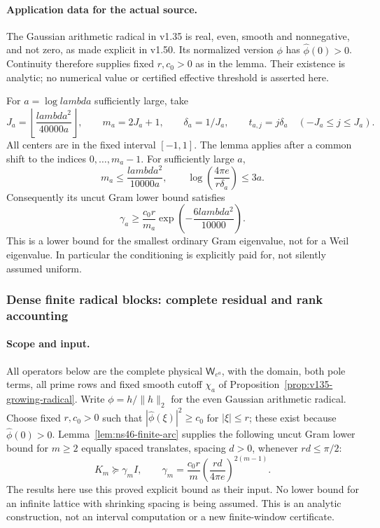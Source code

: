 \documentclass[11pt]{article}
\def\lambda{lambda}%
\theoremstyle{remark}
\begin{document}
\paragraph{Application data for the actual source.}
The Gaussian arithmetic radical in v1.35 is real, even, smooth and
nonnegative, and not zero, as made explicit in v1.50. Its normalized
version $\phi$ has $\widehat\phi(0)>0$. Continuity therefore supplies
fixed $r,c_0>0$ as in the lemma. Their existence is analytic; no numerical
value or certified effective threshold is asserted here.

For $a=\log\lambda$ sufficiently large, take
\[
 J_a=\left\lfloor\frac{\lambda^2}{40000a}\right\rfloor,
 \qquad m_a=2J_a+1,\qquad \delta_a=1/J_a,
 \qquad t_{a,j}=j\delta_a\quad(-J_a\le j\le J_a).
\]
All centers are in the fixed interval $[-1,1]$.
The lemma applies after a common shift to the indices $0,\ldots,m_a-1$.
For sufficiently large $a$,
\[
 m_a\le\frac{\lambda^2}{10000a},\qquad
 \log\left(\frac{4\pi e}{r\delta_a}\right)\le3a.
\]
Consequently its uncut Gram lower bound satisfies
\begin{equation}\label{eq:ns46-gram-asymptotic}
 \gamma_a\ge\frac{c_0r}{m_a}
       \exp\left(-\frac{6\lambda^2}{10000}\right).
\end{equation}
This is a lower bound for the smallest ordinary Gram eigenvalue,
not for a Weil eigenvalue. In particular the conditioning is explicitly
paid for, not silently assumed uniform.


\subsubsection{Dense finite radical blocks: complete residual and rank accounting}
\label{ns46-a2-sec-block}

\paragraph{Scope and input.}
All operators below are the complete physical $\mathsf W_{e^a}$,
with the domain, both pole terms, all prime rows and fixed smooth
cutoff $\chi_a$ of Proposition~\ref{prop:v135-growing-radical}.
Write $\phi=h/\|h\|_2$ for the even Gaussian arithmetic radical.
Choose fixed $r,c_0>0$ such that $|\widehat\phi(\xi)|^2\ge c_0$
for $|\xi|\le r$; these exist because $\widehat\phi(0)>0$.
Lemma~\ref{lem:ns46-finite-arc} supplies the following
uncut Gram lower bound for $m\ge2$ equally spaced translates,
spacing $d>0$, whenever $rd\le\pi/2$:
\begin{equation}\label{ns46-a2-eq-arc-input}
 K_m\succeq\gamma_m I,\qquad
 \gamma_m=\frac{c_0r}{m}
       \left(\frac{rd}{4\pi e}\right)^{2(m-1)}.
\end{equation}
The results here use this proved explicit bound as their input.
No lower bound for an infinite lattice with shrinking spacing is
being assumed. This is an analytic construction, not an interval
computation or a new finite-window certificate.
\end{document}
